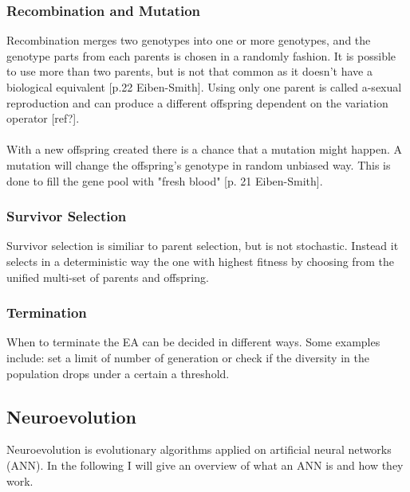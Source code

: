 \subsubsection{Recombination and Mutation}
Recombination merges two genotypes into one or more genotypes, and the genotype parts from each parents is chosen in a randomly fashion. It is possible to use more than two parents, but is not that common as it doesn't have a biological equivalent [p.22 Eiben-Smith]. Using only one parent is called a-sexual reproduction and can produce a different offspring dependent on the variation operator [ref?].
\\
\\
With a new offspring created there is a chance that a mutation might happen. A mutation will change the offspring's genotype in random unbiased way. This is done to fill the gene pool with "fresh blood" [p. 21 Eiben-Smith].
\subsubsection{Survivor Selection}
Survivor selection is similiar to parent selection, but is not stochastic. Instead it selects in a deterministic way the one with highest fitness by choosing from the unified multi-set of parents and offspring.
\subsubsection{Termination}
When to terminate the EA can be decided in different ways. Some examples include: set a limit of number of generation or check if the diversity in the population drops under a certain a threshold.
\subsection{Neuroevolution}
Neuroevolution is evolutionary algorithms applied on artificial neural networks (ANN). In the following I will give an overview of what an ANN is and how they work.
